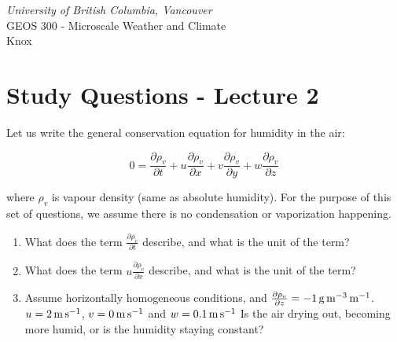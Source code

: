\documentclass[11pt]{article}
\author{Andreas Christen}
\begin{document}
\begin{center}
\emph{University of British Columbia, Vancouver}\\
GEOS 300 - Microscale Weather and Climate\\
Knox
\section*{Study Questions - Lecture 2}
\end{center}



Let us write the general conservation equation for humidity in the air:

\begin{equation}
0 = \frac{\partial \rho_v}{\partial t} + u \frac{\partial \rho_v}{\partial x} + v \frac{\partial \rho_v}{\partial y} + w \frac{\partial \rho_v}{\partial z} 
\end{equation}

where $\rho_v$ is vapour density (same as absolute humidity). For the purpose of this set of questions, we assume there is no condensation or vaporization happening.

\vspace{0.5cm}

\begin{enumerate}

\item What does the term $\frac{\partial \rho_v}{\partial t} $ describe, and what is the unit of the term?

\item What does the term $u \frac{\partial \rho_v}{\partial x}  $ describe, and what is the unit of the term?

\item Assume horizontally homogeneous conditions, and $\frac{\partial \rho_v}{\partial z} = -1\,\rm{g}\,\rm{m}^{-3}\,\rm{m}^{-1}$. $u =  2\,\rm{m}\,\rm{s}^{-1}$, $v =  0\,\rm{m}\,\rm{s}^{-1}$ and $w = 0.1 \,\rm{m}\,\rm{s}^{-1}$  Is the air drying out, becoming more humid, or is the humidity staying constant?

\end{enumerate}

\noindent
\end{document}
